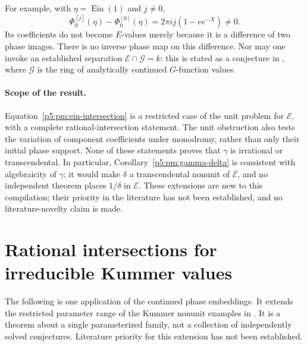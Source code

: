 \documentclass[11pt,a4paper]{article}
\theoremstyle{definition}
\theoremstyle{remark}
\numberwithin{equation}{section}
\begin{document}
For example, with $\eta=\operatorname{Ein}(1)$ and $j\ne0$,
\[
 \Phi_0^{[j]}(\eta)-\Phi_0^{[0]}(\eta)
       =2\pi i j(1-e e^{-X})\ne0.
\]
Its coefficients do not become $E$-values merely because it is a
difference of two phase images.  There is no inverse phase map on
this difference.  Nor may one invoke an established separation
$\mathcal E\cap\mathcal G=k$: this is stated as a conjecture in
\cite[p.~38]{p5:FischlerRivoal2024Mixed}, where $\mathcal G$ is the
ring of analytically continued $G$-function values.

\paragraph{Scope of the result.}
Equation~\eqref{p5:pm:ein-intersection} is a restricted case of the
unit problem for $\mathcal E$, with a complete rational-intersection
statement.  The unit obstruction also tests the variation of
component coefficients under monodromy, rather than only their
initial phase support.  None of these statements proves that
$\gamma$ is irrational or transcendental.  In particular,
Corollary~\ref{p5:pm:gamma-delta} is consistent with algebraicity of
$\gamma$: it would make $\delta$ a transcendental nonunit of
$\mathcal E$, and no independent theorem places $1/\delta$ in
$\mathcal E$.
These extensions are new to this compilation; their priority in the
literature has not been established, and no literature-novelty claim
is made.


\section{Rational intersections for irreducible Kummer values}
\label{p5:km:section}

The following is one application of the continued phase embeddings.
It extends the restricted parameter range of the Kummer nonunit
examples in \cite[Theorem~1.1 and \S4.3]{p5:FischlerRivoal2026Units}.
It is a theorem about a single parameterized family, not a collection
of independently solved conjectures.  Literature priority for this
extension has not been established.
\end{document}
